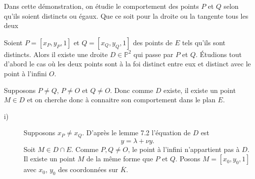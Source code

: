 Dans cette démonstration, on étudie le comportement des points $P$ et $Q$ selon qu'ils soient distincts ou égaux. Que ce soit pour la droite ou la tangente tous les deux 
\begin{demonstration}
    \begin{description}
        Soient $P = \left[ x_{P}, y_{P}, 1 \right]$ et $Q = \left[ x_{Q}, y_{Q}, 1 \right]$ des points de $E$ tels qu'ils sont distincts. Alors il existe une droite $D \in \mathbb{P} ^2$ qui passe par $P$ et $Q$.
        Étudions tout d'abord le cas où les deux points sont à la foi distinct entre eux et distinct avec le point à l'infini $O$.
        \item[1)] Supposons $P \neq Q$, $P \neq O$ et $Q \neq O$. Donc comme $D$ existe, il existe un point $M \in D$ et on cherche donc à connaitre son comportement dans le plan $E$.
            \begin{description}
        \item[i)] Supposons $x_{P} \neq x_{Q}$. D'après le lemme 7.2 l'équation de $D$ est
            \[
            y = \lambda  + \nu y
            .\] 
            Soit $M \in D \cap E$. Comme $P,Q \neq O$, le point à l'infini n'appartient pas à $D$. Il existe un point $M$ de la même forme que $P$ et $Q$.
            Posons $M = \left[ x_0, y_0, 1 \right]$ avec $x_0$, $y_0$ des coordonnées sur $\overline{K}$.


\end{description}
\end{description}
\end{demonstration}
